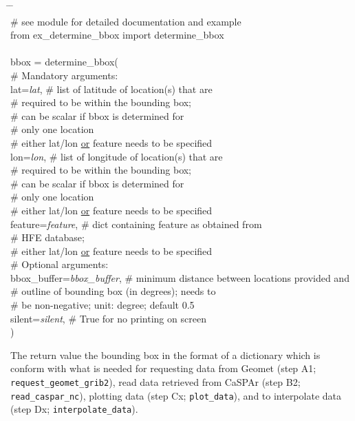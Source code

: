 \documentclass[10pt,a4paper,titlepage,parskip]{scrartcl}
\newenvironment{ttfont}{\fontfamily{\ttdefault}\selectfont}{\par}
\newcommand{\GRAU}[1]{\textcolor{ufzgray2}{#1}}
\begin{document}
\begin{framed}
	\vspace*{-1.2cm}
	\begin{ttfont}
		\begin{tabbing}
			\hspace{1.0cm} \= \hspace{4.7cm} \= \kill \\[4pt]
			\GRAU{\# see module for detailed documentation and example}\\
			from ex\_determine\_bbox import determine\_bbox\\
			\\
			bbox = determine\_bbox(\\
			\> \GRAU{\# Mandatory arguments:}\\
			\> lat=\textit{lat}, \> \GRAU{\# list of latitude of location(s) that are}\\
			\> \> \GRAU{\# required to be within the bounding box;}\\
			\> \> \GRAU{\# can be scalar if bbox is determined for}\\
			\> \> \GRAU{\# only one location}\\
			\> \> \GRAU{\# either lat/lon \underline{or} feature needs to be specified}\\
			\> lon=\textit{lon}, \> \GRAU{\# list of longitude of location(s) that are}\\
			\> \> \GRAU{\# required to be within the bounding box;}\\
			\> \> \GRAU{\# can be scalar if bbox is determined for}\\
			\> \> \GRAU{\# only one location}\\
			\> \> \GRAU{\# either lat/lon \underline{or} feature needs to be specified}\\
			\> feature=\textit{feature}, \> \GRAU{\# dict containing feature as obtained from}\\
			\> \> \GRAU{\# HFE database;}\\
			\> \> \GRAU{\# either lat/lon \underline{or} feature needs to be specified}\\
			\> \GRAU{\# Optional arguments:}\\
			\> bbox\_buffer=\textit{bbox\_buffer}, \> \GRAU{\# minimum distance between locations provided and}\\
			\> \> \GRAU{\# outline of bounding box (in degrees); needs to}\\
			\> \> \GRAU{\# be non-negative; unit: degree; default 0.5}\\
			\> silent=\textit{silent}, \> \GRAU{\# True for no printing on screen}\\
			\> ) \> 
		\end{tabbing}
	\end{ttfont}
	\vspace*{-0.3cm}
\end{framed}
\vspace*{-0.3cm}
The return value the bounding box in the format of a dictionary which is conform with what is needed for requesting data from Geomet (step A1; \texttt{request\_geomet\_grib2}), read data retrieved from CaSPAr (step B2; \texttt{read\_caspar\_nc}), plotting data (step Cx; \texttt{plot\_data}), and to interpolate data (step Dx; \texttt{interpolate\_data}). 
\end{document}
